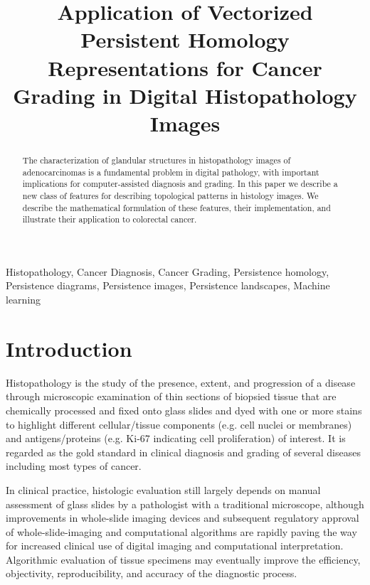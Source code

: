 \documentclass{article}
\title{Application of Vectorized Persistent Homology Representations for 
Cancer Grading in Digital Histopathology Images}
\begin{document}
%
\maketitle
%
\begin{abstract}
The characterization of glandular structures in histopathology images of adenocarcinomas is a fundamental problem in digital pathology, with important implications for computer-assisted diagnosis and grading. In this paper we describe a new class of features for describing topological patterns in histology images. We describe the mathematical formulation of these features, their implementation, and illustrate their application to colorectal cancer.

\end{abstract}
%
\begin{keywords}
Histopathology, Cancer Diagnosis, Cancer Grading, Persistence homology, Persistence diagrams, Persistence images, Persistence landscapes, Machine learning
\end{keywords}
%
\section{Introduction}
\label{sec:intro}
Histopathology is the study of the presence, extent, and progression of a disease through microscopic examination of thin sections of biopsied tissue that are chemically processed and fixed onto glass slides and dyed with one or more stains to highlight different cellular/tissue components (e.g. cell nuclei or membranes) and antigens/proteins (e.g. Ki-67 indicating cell proliferation) of interest. It is regarded as the gold standard in clinical diagnosis and grading of several diseases including most types of cancer. 

In clinical practice, histologic evaluation still largely depends on manual assessment of glass slides by a pathologist with a traditional microscope, although improvements in whole-slide imaging devices and subsequent regulatory approval of whole-slide-imaging and computational algorithms are rapidly paving the way for increased clinical use of digital imaging and computational interpretation. Algorithmic evaluation of tissue specimens may eventually improve the efficiency, objectivity, reproducibility, and accuracy of the diagnostic process.
\end{document}
